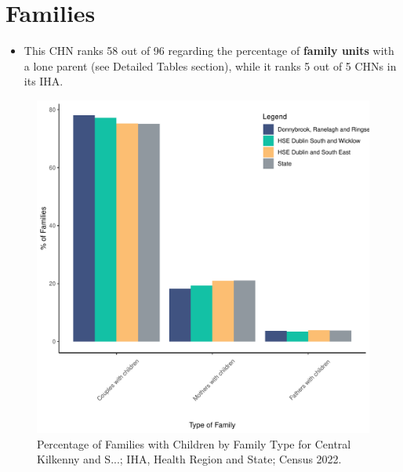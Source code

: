 \documentclass{article}
\begin{document}
\section{Families}\label{sect:Fam}
\begin{itemize}
\item This CHN ranks  58 out of 96 regarding the percentage of \textbf{family units} with a lone parent (see Detailed Tables section), while it ranks   5 out of 5 CHNs in its IHA.
\end{itemize}
\begin{figure}[H]
	\centering
	\includegraphics[width = 150mm]{../figures/FamED.pdf}
	\caption{Percentage of Families with Children by Family Type for Central Kilkenny and S...; IHA, Health Region and State; Census 2022.}
	\label{fig:vbnv}
	\end{figure}
	
\end{document}
